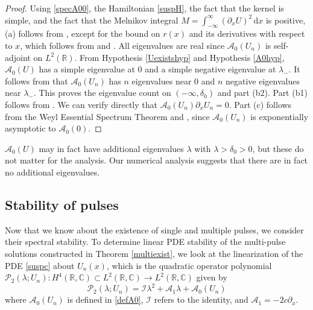 \documentclass[review,onefignum,onetabnum]{siamart171218}
\newcommand{\C}{\mathbb{C}}
\newcommand{\R}{\mathbb{R}}
\newcommand{\rmd}{\mathrm{d}}
\newcommand{\calA}{\mathcal{A}}
\newcommand{\calI}{\mathcal{I}}
\newcommand{\calP}{\mathcal{P}}
\begin{document}
\begin{proof}
Using \cref{specA00}, the Hamiltonian \cref{suspH}, the fact that the kernel is simple,
and the fact that the Melnikov integral $M = \int_{-\infty}^\infty (\partial_x U)^2\,\rmd x$ is positive, (a) follows from \cite[Theorem~3.6]{sandstede:iol97}, except for the bound on $r(x)$ and its derivatives with respect to $x$, which follows from \cite{Sanstede1993} and \cite{sandstede:som98}. All eigenvalues are real since $\calA_0(U_n)$ is self-adjoint on $L^2(\R)$.  From Hypothesis \ref{Uexistshyp} and Hypothesis \ref{A0hyp}, $\calA_0(U)$ has a simple eigenvalue at 0 and a simple negative eigenvalue at $\lambda_-$. It follows from \cite{alexander:ati90} that $\calA_0(U_n)$ has $n$ eigenvalues near 0 and $n$ negative eigenvalues near $\lambda_-$. This proves the eigenvalue count on $(-\infty, \delta_0)$ and part (b2). Part (b1) follows from \cite{sandstede:som98}. We can verify directly that $\calA_0(U_n)\partial_x U_n = 0$. Part (c) follows from the Weyl Essential Spectrum Theorem \cite[Theorem~2.2.6]{kapitula:sad13} and \cite[Theorem~3.1.11]{kapitula:sad13}, since $\calA_0(U_n)$ is exponentially asymptotic to $\calA_0(0)$.
\end{proof}

\begin{remark}$\calA_0(U)$ may in fact have additional eigenvalues $\lambda$ with $\lambda > \delta_0 > 0$, but these do not matter for the analysis. Our numerical analysis suggests that there are in fact no additional eigenvalues.
\end{remark}

\subsection{Stability of pulses}

Now that we know about the existence of single and multiple pulses, we consider their spectral stability. To determine linear PDE stability of the multi-pulse solutions constructed in Theorem \ref{multiexist}, we look at the linearization of the PDE \cref{suspc} about $U_n(x)$, which is the quadratic operator polynomial 
$\calP_2(\lambda; U_n): H^4(\R, \C) \subset L^2(\R,\C) \rightarrow L^2(\R,\C)$
given by
\begin{equation}\label{quadeig}
\calP_2(\lambda; U_n) = \calI \lambda^2 + \calA_1 \lambda + \calA_0(U_n)
\end{equation}
where $\calA_0(U_n)$ is defined in \cref{defA0}, $\calI$ refers to the identity, and $\calA_1=-2 c \partial_x$.
\end{document}
